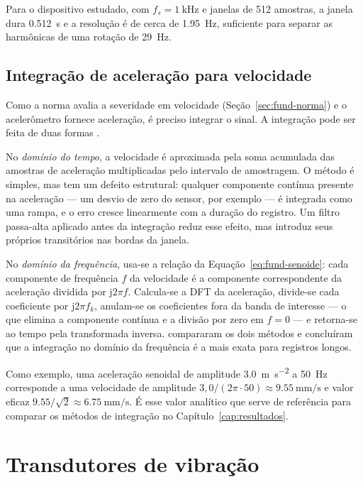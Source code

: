 Para o dispositivo estudado, com $f_s = \SI{1}{\kilo\hertz}$ e janelas de \num{512}
amostras, a janela dura \SI{0,512}{\second} e a resolução é de cerca de
\SI{1,95}{\hertz}, suficiente para separar as harmônicas de uma rotação de
\SI{29}{\hertz}.

\subsection{Integração de aceleração para velocidade}
\label{sec:fund-integracao}

Como a norma avalia a severidade em velocidade (Seção~\ref{sec:fund-norma}) e o
acelerômetro fornece aceleração, é preciso integrar o sinal. A integração pode ser feita de
duas formas \cite{brandt2014}.

No \emph{domínio do tempo}, a velocidade é aproximada pela soma acumulada das amostras de
aceleração multiplicadas pelo intervalo de amostragem. O método é simples, mas tem um
defeito estrutural: qualquer componente contínua presente na aceleração --- um desvio de
zero do sensor, por exemplo --- é integrada como uma rampa, e o erro cresce linearmente com
a duração do registro. Um filtro passa-alta aplicado antes da integração reduz esse efeito,
mas introduz seus próprios transitórios nas bordas da janela.

No \emph{domínio da frequência}, usa-se a relação da Equação~\eqref{eq:fund-senoide}: cada
componente de frequência $f$ da velocidade é a componente correspondente da aceleração
dividida por $\mathrm{j}2\pi f$. Calcula-se a DFT da aceleração, divide-se cada coeficiente
por $\mathrm{j}2\pi f_k$, anulam-se os coeficientes fora da banda de interesse --- o que
elimina a componente contínua e a divisão por zero em $f = 0$ --- e retorna-se ao tempo pela
transformada inversa.  compararam os dois métodos e concluíram que a
integração no domínio da frequência é a mais exata para registros longos.

Como exemplo, uma aceleração senoidal de amplitude \SI{3,0}{\meter\per\second\squared} a
\SI{50}{\hertz} corresponde a uma velocidade de amplitude
$3{,}0/(2\pi \cdot 50) \approx \SI{9,55}{\milli\meter\per\second}$ e valor eficaz
$\num{9,55}/\sqrt{2} \approx \SI{6,75}{\milli\meter\per\second}$. É esse valor analítico que
serve de referência para comparar os métodos de integração no
Capítulo~\ref{cap:resultados}.

\section{Transdutores de vibração}
\label{sec:fund-transdutores}

